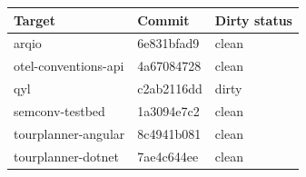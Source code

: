 \begin{tabular}{lll}
\hline
Target & Commit & Dirty status \\
\hline
arqio & 6e831bfad9 & clean \\
otel-conventions-api & 4a67084728 & clean \\
qyl & c2ab2116dd & dirty \\
semconv-testbed & 1a3094e7c2 & clean \\
tourplanner-angular & 8c4941b081 & clean \\
tourplanner-dotnet & 7ae4c644ee & clean \\
\hline
\end{tabular}
